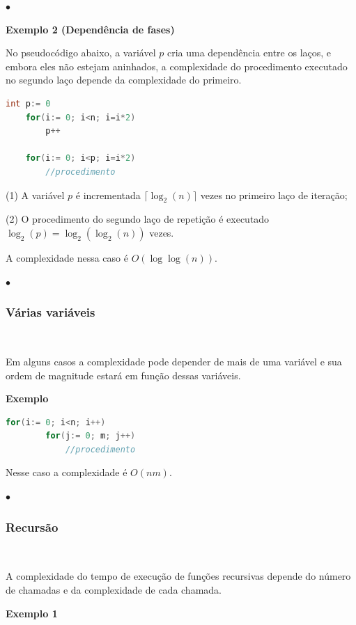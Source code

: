 {\raggedleft $\bullet$ \par}

\textbf{Exemplo 2 (Dependência de fases)}  

No pseudocódigo abaixo, a variável $p$ cria uma dependência entre os laços, e embora eles não estejam aninhados, a complexidade do procedimento executado no segundo laço depende da complexidade do primeiro.

\begin{lstlisting}[language=C, frame=single]
    int p:= 0
    for(i:= 0; i<n; i=i*2)
        p++
    
    for(i:= 0; i<p; i=i*2)
        //procedimento
\end{lstlisting}

(1) A variável $p$ é incrementada $\lceil \log_2(n) \rceil$ vezes no primeiro laço de iteração;

(2) O procedimento do segundo laço de repetição é executado $\log_2(p) = \log_2(\log_2(n))$ vezes.

A complexidade nessa caso é $O(\log\log(n))$.

{\raggedleft $\bullet$ \par}

\subsubsection{Várias variáveis}
\

Em alguns casos a complexidade pode depender de mais de uma variável e sua ordem de magnitude estará em função dessas variáveis.

\textbf{Exemplo}  

\begin{lstlisting}[language=C, frame=single]
    for(i:= 0; i<n; i++)
        for(j:= 0; m; j++)
            //procedimento
\end{lstlisting}

Nesse caso a complexidade é $O(nm)$.

{\raggedleft $\bullet$ \par}

\subsubsection{Recursão}
\

A complexidade do tempo de execução de funções recursivas depende do número de chamadas e da complexidade de cada chamada.

\textbf{Exemplo 1} 

